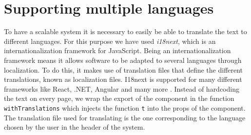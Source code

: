\section{Supporting multiple languages}
To have a scalable system it is necessary to easily be able to translate the text to different languages.
For this purpose we have used \textit{i18next}, which is an internationalization framework for JavaScript.
Being an internationalization framework means it allows software to be adapted to several languages through localization.
To do this, it makes use of translation files that define the different translations, known as localization files.
I18next is supported for many different frameworks like React, .NET, Angular and many more \cite{i18next}.
Instead of hardcoding the text on every page, we wrap the export of the component in the function \texttt{withTranslations} which injects the function \texttt{t} into the props of the component.
The translation file used for translating is the one corresponding to the language chosen by the user in the header of the system.

